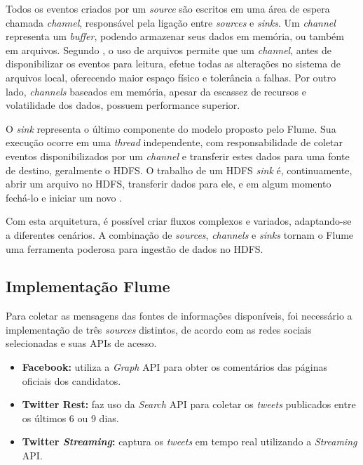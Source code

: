 Todos os eventos criados por um \textit{source} são escritos em uma área de espera chamada \textit{channel}, responsável pela ligação entre \textit{sources} e \textit{sinks}. Um \textit{channel} representa um \textit{buffer}, podendo armazenar seus dados em memória, ou também em arquivos. Segundo , o uso de arquivos permite que um \textit{channel}, antes de disponibilizar os eventos para leitura, efetue todas as alterações no sistema de arquivos local, oferecendo maior espaço físico e tolerância a falhas. Por outro lado, \textit{channels} baseados em memória, apesar da escassez de recursos e volatilidade dos dados, possuem performance superior.

O \textit{sink} representa o último componente do modelo proposto pelo Flume. Sua execução ocorre em uma \textit{thread} independente, com responsabilidade de coletar eventos disponibilizados por um \textit{channel} e transferir estes dados para uma fonte de destino, geralmente o HDFS. O trabalho de um HDFS \textit{sink} é, continuamente, abrir um arquivo no HDFS, transferir dados para ele, e em algum momento fechá-lo e iniciar um novo \cite{hoffmanFlume}.

Com esta arquitetura, é possível criar fluxos complexos e variados, adaptando-se a diferentes cenários. A combinação de \textit{sources}, \textit{channels} e \textit{sinks} tornam o Flume uma ferramenta poderosa para ingestão de dados no HDFS.

\subsection{Implementação Flume}

Para coletar as mensagens das fontes de informações disponíveis, foi necessário a implementação de três \textit{sources} distintos, de acordo com as redes sociais selecionadas e suas APIs de acesso.

\begin{itemize}

  \item \textbf{Facebook:} utiliza a \textit{Graph} API para obter os comentários das páginas oficiais dos candidatos.
  \item \textbf{Twitter Rest:} faz uso da \textit{Search} API para coletar os \textit{tweets} publicados entre os últimos 6 ou 9 dias.
  \item \textbf{Twitter \textit{Streaming}:} captura os \textit{tweets} em tempo real utilizando a \textit{Streaming} API.

\end{itemize}

